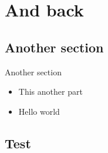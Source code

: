 \chapter{And back}

\section{Another section}


\begin{frame}[fragile]{Another section}

\begin{itemize}
\item\relax 
This another part



\item\relax 
Hello world




\end{itemize}
\end{frame}

\section{Test}

